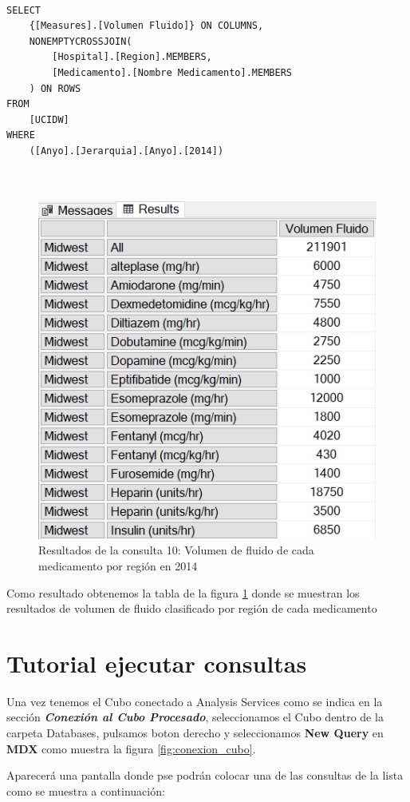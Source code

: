 \documentclass{article}
\begin{document}
\begin{lstlisting}[style=ddlstyle, label=lst:consulta10,caption=Consulta 10: Volumen de fluido de cada medicamento por region en 2014]
	
SELECT 
	{[Measures].[Volumen Fluido]} ON COLUMNS, 
	NONEMPTYCROSSJOIN(
		[Hospital].[Region].MEMBERS, 
		[Medicamento].[Nombre Medicamento].MEMBERS
	) ON ROWS
FROM 
	[UCIDW]
WHERE 
	([Anyo].[Jerarquia].[Anyo].[2014])

	
\end{lstlisting}


\begin{figure}[H]
	\centering
	\includegraphics[width=0.4\linewidth]{images/consulta10.png}
	\caption{Resultados de la consulta 10: Volumen de fluido de cada medicamento por región en 2014}
	\label{fig:consulta10}
\end{figure}

Como resultado obtenemos la tabla de la figura \ref{fig:consulta10} donde se muestran los resultados de volumen de fluido clasificado por región de cada medicamento

\section{Tutorial ejecutar consultas}


	 Una vez tenemos el Cubo conectado a Analysis Services como se indica en la sección \textbf{\textit{Conexión al Cubo Procesado}}, seleccionamos el Cubo dentro de la carpeta Databases, pulsamos boton derecho y seleccionamos \textbf{New Query} en \textbf{MDX} como muestra la figura \ref{fig:conexion_cubo}.
	 
	 Aparecerá una pantalla donde pse podrán colocar una de las consultas de la lista como se muestra a continuación: 
	 
\end{document}
